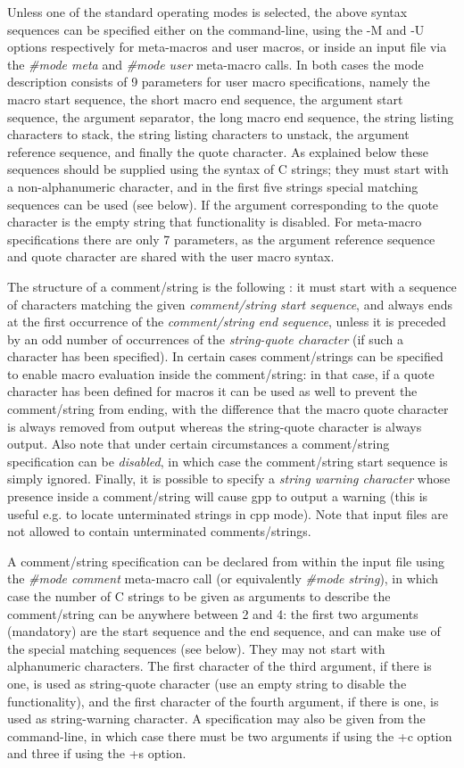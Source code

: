 Unless one of the standard operating modes is selected, the above syntax
sequences can be specified either on the command-line, using the -M and -U
options respectively for meta-macros and user macros, or inside an input file
via the {\it \#mode meta} and {\it \#mode user} meta-macro calls. In both
cases the mode description consists of 9 parameters for user macro
specifications, namely the macro start sequence, the short macro end sequence,
the argument start sequence, the argument separator, the long macro end
sequence, the string listing characters to stack, the string listing
characters to unstack, the argument reference sequence, and finally the quote
character. As explained below these sequences should be supplied using the
syntax of C strings; they must start with a non-alphanumeric character, and in
the first five strings special matching sequences can be used (see below). If
the argument corresponding to the quote character is the empty string that
functionality is disabled. For meta-macro specifications there are only 7
parameters, as the argument reference sequence and quote character are shared
with the user macro syntax. 

The structure of a comment/string is the following : it must start with a
sequence of characters matching the given {\it comment/string start sequence},
and always ends at the first occurrence of the {\it comment/string end
sequence}, unless it is preceded by an odd number of occurrences of the {\it
string-quote character} (if such a character has been specified). In certain
cases comment/strings can be specified to enable macro evaluation inside the
comment/string: in that case, if a quote character has been defined for macros
it can be used as well to prevent the comment/string from ending, with the
difference that the macro quote character is always removed from output
whereas the string-quote character is always output. Also note that under
certain circumstances a comment/string specification can be {\it disabled}, in
which case the comment/string start sequence is simply ignored. Finally, it is
possible to specify a {\it string warning character} whose presence inside a
comment/string will cause gpp to output a warning (this is useful e.g. to
locate unterminated strings in cpp mode). Note that input files are not
allowed to contain unterminated comments/strings. 

A comment/string specification can be declared from within the input file
using the {\it \#mode comment} meta-macro call (or equivalently {\it \#mode
string}), in which case the number of C strings to be given as arguments to
describe the comment/string can be anywhere between 2 and 4: the first two
arguments (mandatory) are the start sequence and the end sequence, and can
make use of the special matching sequences (see below). They may not start
with alphanumeric characters. The first character of the third argument, if
there is one, is used as string-quote character (use an empty string to
disable the functionality), and the first character of the fourth argument, if
there is one, is used as string-warning character. A specification may also be
given from the command-line, in which case there must be two arguments if
using the +c option and three if using the +s option. 

